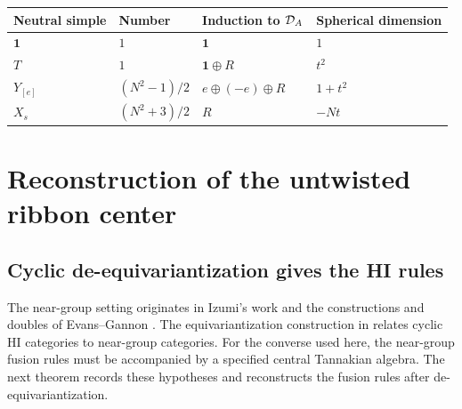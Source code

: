 \documentclass[11pt,a4paper]{article}
\numberwithin{equation}{section}
\theoremstyle{definition}\newtheorem{definition}[theorem]{Definition}
\theoremstyle{remark}\newtheorem{remark}[theorem]{Remark}
\newcommand{\one}{\mathbf1}\newcommand{\B}{\mathcal B}\newcommand{\W}{W_N}
\begin{document}
\begin{center}
\begin{tabular}{llll}
\toprule
Neutral simple & Number & Induction to \(\mathcal D_A\) & Spherical dimension\\
\midrule
\(\one\) & \(1\) & \(\one\) & \(1\)\\
\(T\) & \(1\) & \(\one\oplus R\) & \(t^2\)\\
\(Y_{[e]}\) & \((N^2-1)/2\) & \(e\oplus(-e)\oplus R\) & \(1+t^2\)\\
\(X_s\) & \((N^2+3)/2\) & \(R\) & \(-Nt\)\\
\bottomrule
\end{tabular}
\end{center}


\section{Reconstruction of the untwisted ribbon center}
\label{sec:actual-center}

\subsection{Cyclic de-equivariantization gives the HI rules}
\label{audit:cyclicreconstruction}

The near-group setting originates in Izumi's work \cite{izumi}
and the constructions and doubles of Evans--Gannon
\cite{evansgannon2014,evansgannon2017}.
The equivariantization construction in \cite[Section 6]{gsy}
relates cyclic HI categories to near-group categories. For the
converse used here, the near-group fusion rules must be accompanied
by a specified central Tannakian algebra. The next theorem records
these hypotheses and reconstructs the fusion rules after
de-equivariantization.
\end{document}
